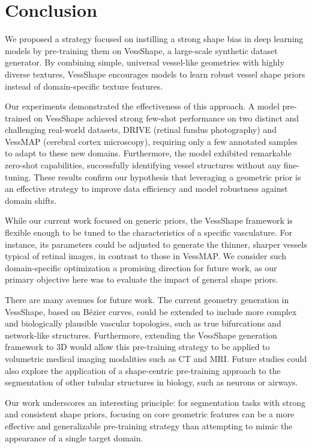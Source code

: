 \documentclass[%
reprint,
nofootinbib,
 amsmath,amssymb,
aps,
superscriptaddress,
showkeys,
longbibliography
]{revtex4-1}
\begin{document}
\section{Conclusion}
\label{s:conclusion}

We proposed a strategy focused on instilling a strong shape bias in deep learning models by pre-training them on VessShape, a large-scale synthetic dataset generator. By combining simple, universal vessel-like geometries with highly diverse textures, VessShape encourages models to learn robust vessel shape priors instead of domain-specific texture features.

Our experiments demonstrated the effectiveness of this approach. A model pre-trained on VessShape achieved strong few-shot performance on two distinct and challenging real-world datasets, DRIVE (retinal fundus photography) and VessMAP (cerebral cortex microscopy), requiring only a few annotated samples to adapt to these new domains. Furthermore, the model exhibited remarkable zero-shot capabilities, successfully identifying vessel structures without any fine-tuning. These results confirm our hypothesis that leveraging a geometric prior is an effective strategy to improve data efficiency and model robustness against domain shifts.

While our current work focused on generic priors, the VessShape framework is flexible enough to be tuned to the characteristics of a specific vasculature. For instance, its parameters could be adjusted to generate the thinner, sharper vessels typical of retinal images, in contrast to those in VessMAP. We consider such domain-specific optimization a promising direction for future work, as our primary objective here was to evaluate the impact of general shape priors.

There are many avenues for future work. The current geometry generation in VessShape, based on Bézier curves, could be extended to include more complex and biologically plausible vascular topologies, such as true bifurcations and network-like structures. Furthermore, extending the VessShape generation framework to 3D would allow this pre-training strategy to be applied to volumetric medical imaging modalities such as CT and MRI. Future studies could also explore the application of a shape-centric pre-training approach to the segmentation of other tubular structures in biology, such as neurons or airways.

Our work underscores an interesting principle: for segmentation tasks with strong and consistent shape priors, focusing on core geometric features can be a more effective and generalizable pre-training strategy than attempting to mimic the appearance of a single target domain.
\end{document}
